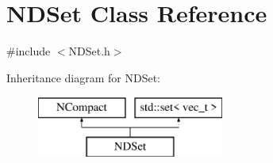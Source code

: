 \hypertarget{class_n_d_set}{}\section{N\+D\+Set Class Reference}
\label{class_n_d_set}


{\ttfamily \#include $<$N\+D\+Set.\+h$>$}

Inheritance diagram for N\+D\+Set\+:\begin{figure}[H]
\begin{center}
\leavevmode
\includegraphics[height=2.000000cm]{class_n_d_set}
\end{center}
\end{figure}
